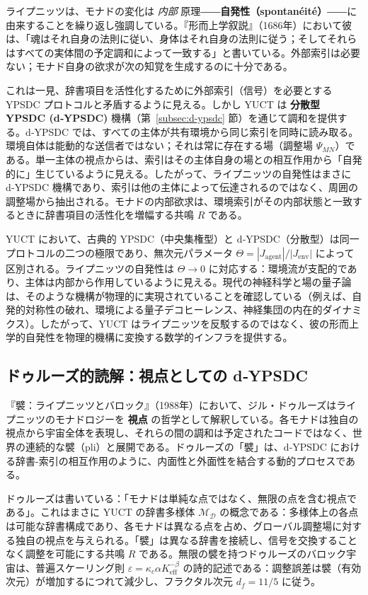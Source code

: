 \documentclass[12pt,a4paper]{article}
\begin{document}
	ライプニッツは、モナドの変化は \emph{内部} 原理――\textbf{自発性（spontanéité）}――に由来することを繰り返し強調している。『形而上学叙説』（1686年）において彼は、「魂はそれ自身の法則に従い、身体はそれ自身の法則に従う；そしてそれらはすべての実体間の予定調和によって一致する」と書いている。外部索引は必要ない；モナド自身の欲求が次の知覚を生成するのに十分である。
	
	これは一見、辞書項目を活性化するために外部索引（信号）を必要とする YPSDC プロトコルと矛盾するように見える。しかし YUCT は \textbf{分散型 YPSDC (d‑YPSDC)} 機構（第~\ref{subsec:d-ypsdc} 節）を通じて調和を提供する。d‑YPSDC では、すべての主体が共有環境から同じ索引を同時に読み取る。環境自体は能動的な送信者ではない；それは常に存在する場（調整場 \(\Psi_{MN}\)）である。単一主体の視点からは、索引はその主体自身の場との相互作用から「自発的に」生じているように見える。したがって、ライプニッツの自発性はまさに d‑YPSDC 機構であり、索引は他の主体によって伝達されるのではなく、周囲の調整場から抽出される。モナドの内部欲求は、環境索引がその内部状態と一致するときに辞書項目の活性化を増幅する共鳴 \(R\) である。
	
	YUCT において、古典的 YPSDC（中央集権型）と d‑YPSDC（分散型）は同一プロトコルの二つの極限であり、無次元パラメータ \(\Theta = |J_{\mathrm{agent}}|/|J_{\mathrm{env}}|\) によって区別される。ライプニッツの自発性は \(\Theta \to 0\) に対応する：環境流が支配的であり、主体は内部から作用しているように見える。現代の神経科学と場の量子論は、そのような機構が物理的に実現されていることを確認している（例えば、自発的対称性の破れ、環境による量子デコヒーレンス、神経集団の内在的ダイナミクス）。したがって、YUCT はライプニッツを反駁するのではなく、彼の形而上学的自発性を物理的機構に変換する数学的インフラを提供する。
	
	\subsection{ドゥルーズ的読解：視点としての d‑YPSDC}
	
	『襞：ライプニッツとバロック』（1988年）において、ジル・ドゥルーズはライプニッツのモナドロジーを \textbf{視点} の哲学として解釈している。各モナドは独自の視点から宇宙全体を表現し、それらの間の調和は予定されたコードではなく、世界の連続的な襞（pli）と展開である。ドゥルーズの「襞」は、d‑YPSDC における辞書-索引の相互作用のように、内面性と外面性を結合する動的プロセスである。
	
	ドゥルーズは書いている：「モナドは単純な点ではなく、無限の点を含む視点である」。これはまさに YUCT の辞書多様体 \(\mathcal{M}_{\mathcal{D}}\) の概念である：多様体上の各点は可能な辞書構成であり、各モナドは異なる点を占め、グローバル調整場に対する独自の視点を与えられる。「襞」は異なる辞書を接続し、信号を交換することなく調整を可能にする共鳴 \(R\) である。無限の襞を持つドゥルーズのバロック宇宙は、普遍スケーリング則 \(\varepsilon = \kappa_c \alpha K_{\mathrm{eff}}^{-\beta}\) の詩的記述である：調整誤差は襞（有効次元）が増加するにつれて減少し、フラクタル次元 \(d_f = 11/5\) に従う。
	
\end{document}

